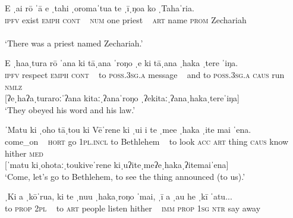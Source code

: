 \ea\label{ex:2.2}
\gll E ˌai rō ˈ{\ꞌ}ā {\textup{\textbar}} e ˌtahi ˌoromaˈtu{\ꞌ}a {\textup{\textbar}} te ˌ{\ꞌ}īˌŋoa  ko ˌTahaˈria.\\
\textsc{ipfv} exist \textsc{emph} \textsc{cont} ~ \textsc{num} one priest ~ \textsc{art} name \textsc{prom} Zechariah\\
[ʔeˌairoːˈʔaː  ʔeˌtahiˌoromaˈtuʔa  teˌʔiːˌŋoakoˌtahaˈria]\\

\glt 
‘There was a priest named Zechariah.’ \textstyleExampleref{[R630-01.002]}
\z

\ea\label{ex:2.3}
\gll E ˌha{\ꞌ}aˌtura  rō ˈ{\ꞌ}ana {\textup{\textbar}} ki tāˌ{\ꞌ}ana ˈroŋo {\textup{\textbar}} ˌ{\ꞌ}e ki tāˌ{\ꞌ}ana ˌhaka ˌtere ˈiŋa.\\
\textsc{ipfv} respect \textsc{emph} \textsc{cont} ~  to \textsc{poss.3sg.a} message ~ and to \textsc{poss.3sg.a} \textsc{caus} run \textsc{nmlz}\\

[ʔeˌhaʔaˌturaroːˈʔana  kitaːˌʔanaˈroŋo  ˌʔekitaːˌʔanaˌhakaˌtereˈiŋa]\\

\glt 
‘They obeyed his word and his law.’ \textstyleExampleref{[R630-01.002]}
\z

\ea\label{ex:2.4}
\gll ˈMatu {\textup{\textbar}} ki ˌoho tāˌtou ki Vēˈrene {\textup{\textbar}} ki ˌu{\ꞌ}i i te ˌme{\ꞌ}e ˌhaka ˌ{\ꞌ}ite mai ˈena.\\
come\_on ~ \textsc{hort} go \textsc{1pl.incl} to Bethlehem ~ to look \textsc{acc} \textsc{art} thing \textsc{caus} know hither \textsc{med}\\

[ˈmatu  kiˌohotaːˌtoukiveˈrene kiˌuʔiteˌmeʔeˌhakaˌʔitemaiˈena]\\

\glt 
‘Come, let’s go to Bethlehem, to see the thing announced (to us).’ \textstyleExampleref{[R630-02.008]}
\z

\ea\label{ex:2.5}
\gll ˌKi a ˌkōˈrua, {\textup{\textbar}} ki te ˌnu{\ꞌ}u ˌhakaˌroŋo ˈmai, {\textup{\textbar}} ˌ{\ꞌ}ī a ˌau he ˌkī ˈatu...\\
to \textsc{prop} \textsc{2pl} ~ to \textsc{art} people listen hither ~ \textsc{imm} \textsc{prop} \textsc{1sg} \textsc{ntr} say away\\

